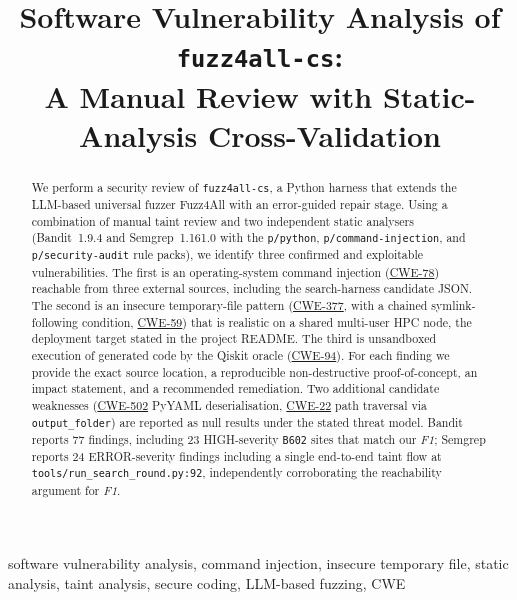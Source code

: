 \documentclass[conference]{IEEEtran}
\newcommand{\cwe}[1]{\href{https://cwe.mitre.org/data/definitions/#1.html}{CWE-#1}}
\begin{document}
\title{Software Vulnerability Analysis of \texttt{fuzz4all-cs}:\\
A Manual Review with Static-Analysis Cross-Validation}

\author{
}

\maketitle

\begin{abstract}
We perform a security review of \texttt{fuzz4all-cs}, a Python harness that
extends the LLM-based universal fuzzer Fuzz4All with an error-guided repair
stage. Using a combination of manual taint review and two independent static
analysers (Bandit~1.9.4 and Semgrep~1.161.0 with the \texttt{p/python},
\texttt{p/command-injection}, and \texttt{p/security-audit} rule packs), we
identify three confirmed and exploitable vulnerabilities. The first is an
operating-system command injection (\cwe{78}) reachable from three external
sources, including the search-harness candidate JSON. The second is an
insecure temporary-file pattern (\cwe{377}, with a chained
symlink-following condition, \cwe{59}) that is realistic on a shared
multi-user HPC node, the deployment target stated in the project README. The
third is unsandboxed execution of generated code by the Qiskit oracle
(\cwe{94}). For each finding we provide the exact source location, a
reproducible non-destructive proof-of-concept, an impact statement, and a
recommended remediation. Two additional candidate weaknesses (\cwe{502}
PyYAML deserialisation, \cwe{22} path traversal via \texttt{output\_folder})
are reported as null results under the stated threat model. Bandit reports
77 findings, including 23 HIGH-severity \texttt{B602} sites that match our
\textit{F1}; Semgrep reports 24 ERROR-severity findings including a single
end-to-end taint flow at
\texttt{tools/run\_search\_round.py:92}, independently corroborating the
reachability argument for \textit{F1}.
\end{abstract}

\begin{IEEEkeywords}
software vulnerability analysis, command injection, insecure temporary file,
static analysis, taint analysis, secure coding, LLM-based fuzzing, CWE
\end{IEEEkeywords}
\end{document}

